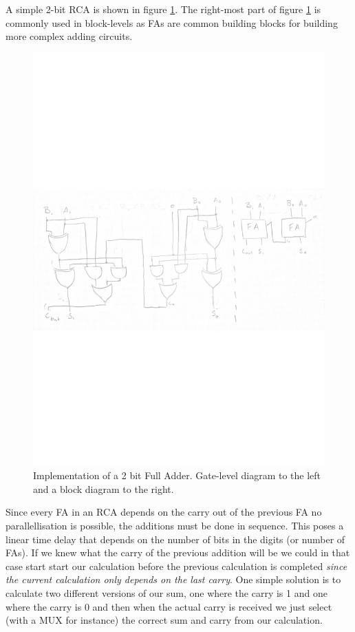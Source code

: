 \documentclass[a4paper,11pt]{report}
\begin{document}
A simple 2-bit RCA is shown in figure \ref{fig:2fa}. The right-most
part of figure \ref{fig:2fa} is commonly used in block-levels as FAs
are common building blocks for building more complex adding circuits.

\begin{figure}[H]
  \centering
  \includegraphics[width=.8\textwidth,trim={0 10cm 0 10cm}]{images/2b-FA.pdf}
  \caption{Implementation of a 2 bit Full Adder. Gate-level diagram to the left and a block diagram to the right.}
  \label{fig:2fa}
\end{figure}

Since every FA in an RCA depends on the carry out of the previous FA
no parallellisation is possible, the additions must be done in
sequence. This poses a linear time delay that depends on the number of
bits in the digits (or number of FAs). If we knew what the carry of
the previous addition will be we could in that case start start our
calculation before the previous calculation is completed \textit{since
  the current calculation only depends on the last carry}. One simple
solution is to calculate two different versions of our sum, one where
the carry is 1 and one where the carry is 0 and then when the actual
carry is received we just select (with a MUX for instance) the correct
sum and carry from our calculation.
\end{document}
